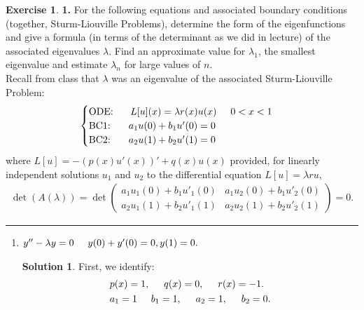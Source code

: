 \documentclass{article}
\theoremstyle{definition}
\newtheorem*{exer*}{Exercise}
\newtheorem*{sln*}{Solution}
\begin{document}
\begin{exer*}\textbf{1.}
	For the following equations and associated boundary conditions (together, Sturm-Liouville Problems),
	determine the form of the eigenfunctions and give a formula (in terms of the determinant as we did in lecture) of
	the associated eigenvalues $\lambda$. Find an approximate value for $\lambda_1$, the smallest eigenvalue and estimate $\lambda_n$ for large
	values of $n$.\\
	
	Recall from class that $\lambda$ was an eigenvalue of the associated Sturm-Liouville Problem:
	\begin{align*}
	\begin{cases}
	\text{ODE: }\hspace{0.5cm} L[u](x) = \lambda r(x)u(x)\hspace{0.5cm} 0<x<1\\
	\text{BC1: }\hspace{0.5cm} a_1u(0) + b_1 u'(0) = 0\\
	\text{BC2: }\hspace{0.5cm} a_2u(1) + b_2u'(1) = 0
	\end{cases}
	\end{align*}
	where $L[u] = -(p(x)u'(x))' + q(x)u(x)$ provided, for linearly independent solutions $u_1$ and $u_2$ to the differential
	equation $L[u] = \lambda ru$,
	\begin{align*}
	\det(A(\lambda)) = \det\begin{pmatrix}
	a_1u_1(0) + b_1 u'_1(0) & a_1u_2(0) + b_1 u'_2(0)\\
	a_2u_1(1) + b_2 u'_1(1) & a_2u_2(1) + b_2 u'_2(1)
	\end{pmatrix} = 0.
	\end{align*}
	
	\noindent\rule{\textwidth}{0.5pt}
	\begin{enumerate}
		\item $y'' - \lambda y = 0\hspace{0.5cm} y(0) + y'(0) = 0, y(1) = 0.$\\
		
		\begin{sln*}
			First, we identify:
			\begin{align*}
			&p(x) = 1,\hspace{0.5cm} q(x) = 0,\hspace{0.5cm} r(x) = -1.\\
			&a_1 = 1\hspace{0.5cm} b_1 = 1,\hspace{0.5cm}a_2 = 1,\hspace{0.5cm} b_2 = 0.
			\end{align*}
			

\end{sln*}
\end{enumerate}
\end{exer*}
\end{document}
